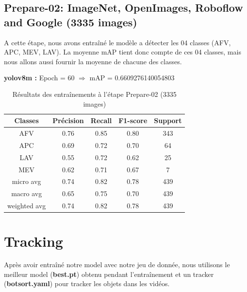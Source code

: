 \subsection*{Prepare-02: ImageNet, OpenImages, Roboflow and Google  (3335 images)}
\label{results-prepare02}

A cette étape, nous avons entraîné le modèle a détecter les 04 classes (AFV, APC, MEV, LAV).
La moyenne mAP tient donc compte de ces 04 classes, mais nous allons aussi fournir la moyenne de chacune des classes.

\textbf{yolov8m :}  Epoch = 60 $\Rightarrow$ mAP = 0.6609276140054803

\begin{table}[H]
    \centering
    \begin{tabular}{|c|c|c|c|c|}
        \hline
        \textbf{Classes} & \textbf{Précision} & \textbf{Recall} & \textbf{F1-score} & \textbf{Support} \\ \hline
        AFV              & 0.76               & 0.85            & 0.80              & 343              \\ \hline
        APC              & 0.69               & 0.72            & 0.70              & 64               \\ \hline
        LAV              & 0.55               & 0.72            & 0.62              & 25               \\ \hline
        MEV              & 0.62               & 0.71            & 0.67              & 7                \\ \hline
        micro avg        & 0.74               & 0.82            & 0.78              & 439              \\ \hline
        macro avg        & 0.65               & 0.75            & 0.70              & 439              \\ \hline
        weighted avg     & 0.74               & 0.82            & 0.78              & 439              \\ \hline
    \end{tabular}
    \caption{Résultats des entraînements à l'étape Prepare-02 (3335 images)}
    \label{tab:map-train-01}
\end{table}




\section{Tracking}

Après avoir entraîné notre model avec notre jeu de donnée, nous utilisons le meilleur model (\textbf{best.pt}) obtenu pendant l'entraînement et un tracker (\textbf{botsort.yaml}) pour tracker les objets dans les vidéos.



